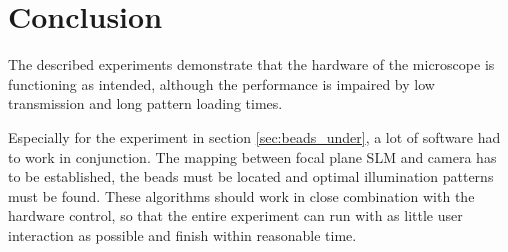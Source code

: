 \section{Conclusion}
The described experiments demonstrate that the hardware of the
microscope is functioning as intended, although the performance is
impaired by low transmission and long pattern loading times.

Especially for the experiment in section \ref{sec:beads_under}, a lot
of software had to work in conjunction. The mapping between focal
plane SLM and camera has to be established, the beads must be located
and optimal illumination patterns must be found. These algorithms
should work in close combination with the hardware control, so that
the entire experiment can run with as little user interaction as
possible and finish within reasonable time.


